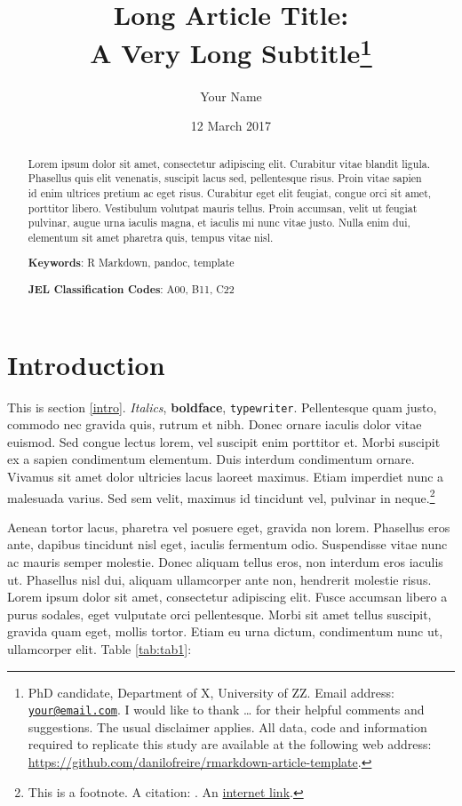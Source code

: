 \documentclass[12pt,a4paper,]{article}
\title{Long Article Title:\\
A Very Long Subtitle\thanks{PhD candidate, Department of X, University of ZZ. Email address:
\href{mailto:your@email.com}{\nolinkurl{your@email.com}}. I would like
to thank \ldots{} for their helpful comments and suggestions. The usual
disclaimer applies. All data, code and information required to replicate
this study are available at the following web address:
\url{https://github.com/danilofreire/rmarkdown-article-template}.}}
\author{Your Name}
\date{12 March 2017}
\begin{document}
\maketitle

\begin{abstract}
\noindent Lorem ipsum dolor sit amet, consectetur adipiscing elit. Curabitur vitae
blandit ligula. Phasellus quis elit venenatis, suscipit lacus sed,
pellentesque risus. Proin vitae sapien id enim ultrices pretium ac eget
risus. Curabitur eget elit feugiat, congue orci sit amet, porttitor
libero. Vestibulum volutpat mauris tellus. Proin accumsan, velit ut
feugiat pulvinar, augue urna iaculis magna, et iaculis mi nunc vitae
justo. Nulla enim dui, elementum sit amet pharetra quis, tempus vitae
nisl.
\vspace{.5cm}

\noindent \textbf{Keywords}: R Markdown, pandoc, template
\vspace{.25cm}

\noindent \textbf{JEL Classification Codes}: A00, B11, C22
\end{abstract}
\newpage

\section{\texorpdfstring{Introduction\label{intro}}{Introduction}}\label{introduction}

\setlength{\parindent}{1cm} \setlength{\parskip}{0pt}

This is section \ref{intro}. \emph{Italics}, \textbf{boldface},
\texttt{typewriter}. Pellentesque quam justo, commodo nec gravida quis,
rutrum et nibh. Donec ornare iaculis dolor vitae euismod. Sed congue
lectus lorem, vel suscipit enim porttitor et. Morbi suscipit ex a sapien
condimentum elementum. Duis interdum condimentum ornare. Vivamus sit
amet dolor ultricies lacus laoreet maximus. Etiam imperdiet nunc a
malesuada varius. Sed sem velit, maximus id tincidunt vel, pulvinar in
neque.\footnote{This is a footnote. A citation:
  \citet[pp.~10--15]{freire2014}. An
  \href{http://github.com/danilofreire}{internet link}.}

Aenean tortor lacus, pharetra vel posuere eget, gravida non lorem.
Phasellus eros ante, dapibus tincidunt nisl eget, iaculis fermentum
odio. Suspendisse vitae nunc ac mauris semper molestie. Donec aliquam
tellus eros, non interdum eros iaculis ut. Phasellus nisl dui, aliquam
ullamcorper ante non, hendrerit molestie risus. Lorem ipsum dolor sit
amet, consectetur adipiscing elit. Fusce accumsan libero a purus
sodales, eget vulputate orci pellentesque. Morbi sit amet tellus
suscipit, gravida quam eget, mollis tortor. Etiam eu urna dictum,
condimentum nunc ut, ullamcorper elit. Table \ref{tab:tab1}:
\end{document}
